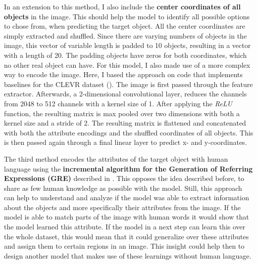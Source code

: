In an extension to this method, I also include the \textbf{center coordinates of all objects} in the image.
This should help the model to identify all possible options to chose from, when predicting the target object.
All the center coordinates are simply extracted and shuffled.
Since there are varying numbers of objects in the image, this vector of variable length is padded to 10 objects, resulting in a vector with a length of 20.
The padding objects have zeros for both coordinates, which no other real object can have.
For this model, I also made use of a more complex way to encode the image.
Here, I based the approach on code that implements baselines for the CLEVR dataset (\cite{Johnson2017}). 
The image is first passed through the feature extractor.
Afterwards, a 2-dimensional convolutional layer, reduces the channels from 2048 to 512 channels with a kernel size of 1.
After applying the \emph{ReLU} function, the resulting matrix is max pooled over two dimensions with both a kernel size and a stride of 2.
The resulting matrix is flattened and concatenated with both the attribute encodings and the shuffled coordinates of all objects.
This is then passed again through a final linear layer to predict x- and y-coordinates.

The third method encodes the attributes of the target object with human language using the \textbf{incremental algorithm for the Generation of Referring Expressions (GRE)} described in \cite{Dale1995}.
This opposes the idea described before, to share as few human knowledge as possible with the model.
Still, this approach can help to understand and analyze if the model was able to extract information about the objects and more specifically their attributes from the image.
If the model is able to match parts of the image with human words it would show that the model learned this attribute.
If the model in a next step can learn this over the whole dataset, this would mean that it could generalize over these attributes and assign them to certain regions in an image.
This insight could help then to design another model that makes use of these learnings without human language.

